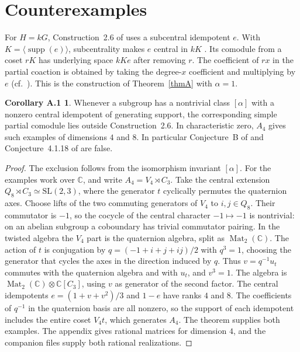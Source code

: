 \documentclass[11pt]{amsart}
\theoremstyle{definition}
\newtheorem*{corA}{Corollary A.1}
\newcommand{\supp}{\operatorname{supp}}
\newcommand{\C}{\mathbb C}
\DeclareMathOperator{\Mat}{Mat}
\begin{document}
\section{Counterexamples}
For $H=kG$, Construction~2.6 of \cite{BHSV} uses a subcentral idempotent $e$. With $K=\langle\supp(e)\rangle$, subcentrality makes $e$ central in $kK$ \cite[\S4.1]{BHSV}. Its comodule from a coset $rK$ has underlying space $kK e$ after removing $r$. The coefficient of $rx$ in the partial coaction is obtained by taking the degree-$x$ coefficient and multiplying by $e$ (cf.\ \cite[(27)]{BHSV}). This is the construction of Theorem~\ref{thmA} with $\alpha=1$.

\begin{corA}
Whenever a subgroup has a nontrivial class $[\alpha]$ with a nonzero central idempotent of generating support, the corresponding simple partial comodule lies outside Construction~2.6. In characteristic zero, $A_4$ gives such examples of dimensions $4$ and $8$. In particular Conjecture~B of \cite{BHSV} and Conjecture~4.1.18 of \cite{H} are false.
\end{corA}

\begin{proof}
The exclusion follows from the isomorphism invariant $[\alpha]$. For the examples work over $\C$, and write $A_4=V_4\rtimes C_3$. Take the central extension $Q_8\rtimes C_3\simeq \mathrm{SL}(2,3)$, where the generator $t$ cyclically permutes the quaternion axes. Choose lifts of the two commuting generators of $V_4$ to $i,j\in Q_8$. Their commutator is $-1$, so the cocycle of the central character $-1\mapsto-1$ is nontrivial: on an abelian subgroup a coboundary has trivial commutator pairing. In the twisted algebra the $V_4$ part is the quaternion algebra, split as $\Mat_2(\C)$. The action of $t$ is conjugation by $q=(-1+i+j+ij)/2$ with $q^3=1$, choosing the generator that cycles the axes in the direction induced by $q$. Thus $v=q^{-1}u_t$ commutes with the quaternion algebra and with $u_t$, and $v^3=1$. The algebra is $\Mat_2(\C)\otimes\C[C_3]$, using $v$ as generator of the second factor. The central idempotents $e=(1+v+v^2)/3$ and $1-e$ have ranks $4$ and $8$. The coefficients of $q^{-1}$ in the quaternion basis are all nonzero, so the support of each idempotent includes the entire coset $V_4t$, which generates $A_4$. The theorem supplies both examples. The appendix gives rational matrices for dimension $4$, and the companion files supply both rational realizations.
\end{proof}
\end{document}
